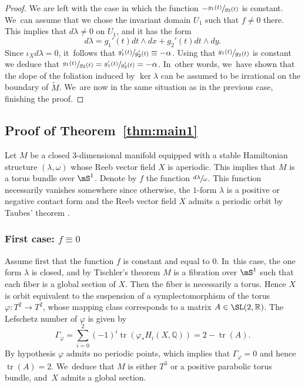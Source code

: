 \begin{proof}
\Changelback

We are left with the case in which the function $-\sfrac{g_1(t)}{g_2(t)}$ is constant. We~can assume that we chose the invariant domain $U_1$ such that $f\neq 0$ there. This implies that $d\lambda \neq 0$ on $U_1$, and it has the form
\[
d\lambda= g_1'(t) dt\wedge dx + g_2'(t) dt\wedge dy.
\]
Since $\iota_Xd\lambda=0$, it~follows that $\sfrac{g_1'(t)}{g_2'(t)}\equiv -\alpha$. Using that $\sfrac{g_1(t)}{g_2(t)}$ is constant we deduce that $\sfrac{g_1(t)}{g_2(t)}=\sfrac{g_1'(t)}{g_2'(t)}=-{\alpha}$. In~other words, we~have shown that the slope of the foliation induced by $\ker \lambda$ can be assumed to be irrational on the boundary of $\widetilde M$. We~are now in the same situation as in the previous case, finishing the proof.
\end{proof}

\subsection{Proof of Theorem~\ref{thm:main1}}\label{ss:Tisch}

Let $M$ be a closed 3-dimensional manifold equipped with a stable Hamiltonian structure $(\lambda, \omega)$ whose Reeb vector field $X$ is aperiodic. This implies that $M$ is a torus bundle over $\mS^1$. Denote by $f$ the function $\sfrac{d\lambda}{\omega}$. This function necessarily vanishes somewhere since otherwise, the $1$-form $\lambda$ is a positive or negative contact form and the Reeb vector field $X$ admits a periodic orbit by Taubes' theorem
\cite{Taub}.

\subsubsection*{First case: $f\equiv 0$}
Assume first that the function $f$ is constant and equal to $0$. In~this case, the one form $\lambda$ is closed, and by Tischler's theorem \cite{Tis} $M$ is a fibration over $\mS^1$ such that each fiber is a global section of $X$. Then the fiber is necessarily a torus. Hence $X$ is orbit equivalent to the suspension of a symplectomorphism of the torus $\varphi:T^2\to T^2$, whose mapping class corresponds to a matrix $A\in \SL(2,\mathbb{R})$.
The Lefschetz number of $\varphi$ is given by
\begin{equation*}
\Gamma_{\varphi}=\sum_{i=0}^2 (-1)^i\operatorname{tr}(\varphi_*H_i(X,\mathbb{Q}))
								=2- \operatorname{tr}(A).
\end{equation*}
By hypothesis $\varphi$ admits no periodic points, which implies that $\Gamma_{\varphi}=0$ and hence $\operatorname{tr}(A)=2$. We~deduce that $M$ is either $T^3$ or a positive parabolic torus bundle, and~$X$ admits a global section.


